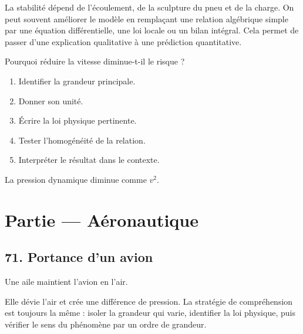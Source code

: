 \documentclass[11pt,a4paper]{article}
\begin{document}
\begin{approfondissementbox}
La stabilité dépend de l'écoulement, de la sculpture du pneu et de la charge.
On peut souvent améliorer le modèle en remplaçant une relation algébrique simple par une équation différentielle, une loi locale ou un bilan intégral. Cela permet de passer d'une explication qualitative à une prédiction quantitative.
\end{approfondissementbox}

\begin{exercicebox}
Pourquoi réduire la vitesse diminue-t-il le risque ?
\begin{enumerate}
  \item Identifier la grandeur principale.
  \item Donner son unité.
  \item Écrire la loi physique pertinente.
  \item Tester l'homogénéité de la relation.
  \item Interpréter le résultat dans le contexte.
\end{enumerate}
\end{exercicebox}

\begin{corrigebox}[Indication]
La pression dynamique diminue comme $v^2$.
\end{corrigebox}


\section{Partie — Aéronautique}


\subsection{71. Portance d'un avion}

\begin{exemplebox}
Une aile maintient l'avion en l'air.
\end{exemplebox}

\begin{methodebox}
Elle dévie l'air et crée une différence de pression.
La stratégie de compréhension est toujours la même : isoler la grandeur qui varie, identifier la loi physique, puis vérifier le sens du phénomène par un ordre de grandeur.
\end{methodebox}
\end{document}
